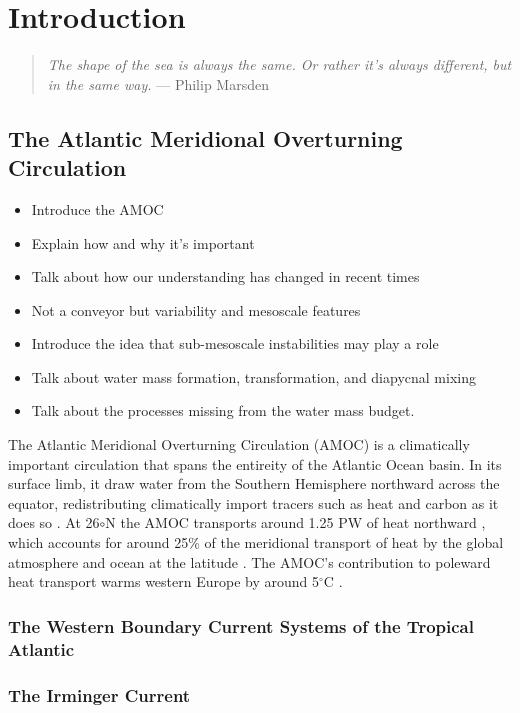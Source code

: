\chapter{Introduction}
\begin{quote}
\textit{The shape of the sea is always the same. Or rather it's always different, but in the same way.} --- Philip Marsden
\end{quote}

\section{The Atlantic Meridional Overturning Circulation}
\begin{itemize}
    \item Introduce the AMOC
    \item Explain how and why it's important
    \item Talk about how our understanding has changed in recent times
    \item Not a conveyor but variability and mesoscale features
    \item Introduce the idea that sub-mesoscale instabilities may play a role
    \item Talk about water mass formation, transformation, and diapycnal mixing
    \item Talk about the processes missing from the water mass budget.
\end{itemize}
The Atlantic Meridional Overturning Circulation (AMOC) is a climatically important circulation that spans the entireity of the Atlantic Ocean basin. In its surface limb, it draw water from the Southern Hemisphere northward across the equator, redistributing climatically import tracers such as heat and carbon as it does so \citep{Buckley2016}. At 26$\circ$N the AMOC transports around 1.25 PW of heat northward \citep{Bryden2020}, which accounts for around 25\% of the meridional transport of heat by the global atmosphere and ocean at the latitude \citep{Srokosz2012}. The AMOC's contribution to poleward heat transport warms western Europe by around 5$^\circ$C \citep{Jackson2015}.

\subsection{The Western Boundary Current Systems of  the Tropical Atlantic}

\subsection{The Irminger Current}

